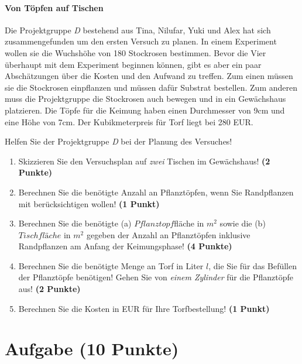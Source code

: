 \documentclass[a4paper, 9pt]{scrartcl}\usepackage[]{graphicx}\usepackage[]{xcolor}
\begin{document}
\ifcollection
\paragraph{Von Töpfen auf Tischen}
\fi



Die Projektgruppe \textit{D} bestehend aus Tina, Nilufar, Yuki und Alex hat sich zusammengefunden um den ersten Versuch zu planen. In einem Experiment wollen sie die Wuchshöhe von 180 Stockrosen bestimmen. Bevor die Vier überhaupt mit dem Experiment beginnen können, gibt es aber ein paar Abschätzungen über die Kosten und den Aufwand zu treffen. Zum einen müssen sie die Stockrosen einpflanzen und müssen dafür Substrat bestellen. Zum anderen muss die Projektgruppe die Stockrosen auch bewegen und in ein Gewächshaus platzieren. Die Töpfe für die Keimung haben
einen Durchmesser von 9cm und eine Höhe von 7cm. Der Kubikmeterpreis für Torf liegt bei 280 EUR.

\vspace{1Ex}

Helfen Sie der Projektgruppe \textit{D} bei der Planung des Versuches!

\begin{enumerate}
\item Skizzieren Sie den Versuchsplan auf \textit{zwei} Tischen im Gewächshaus! \textbf{(2 Punkte)}
\item Berechnen Sie die benötigte Anzahl an Pflanztöpfen, wenn Sie Randpflanzen mit berücksichtigen wollen! \textbf{(1 Punkt)}
\item Berechnen Sie die benötigte (a) $Pflanztopf$fläche in $m^2$ sowie die (b) $Tischfläche$ in $m^2$ gegeben der Anzahl an Pflanztöpfen inklusive Randpflanzen am Anfang der Keimungsphase! \textbf{(4 Punkte)}
\item Berechnen Sie die benötigte Menge an Torf in Liter $l$, die Sie für das Befüllen der Pflanztöpfe benötigen! Gehen Sie von \textit{einem Zylinder} für die Pflanztöpfe aus!  \textbf{(2 Punkte)}
\item Berechnen Sie die Kosten in EUR für Ihre Torfbestellung! \textbf{(1 Punkt)}
\end{enumerate}



 
\clearpage

\section{Aufgabe \hfill (10 Punkte)}
\end{document}
